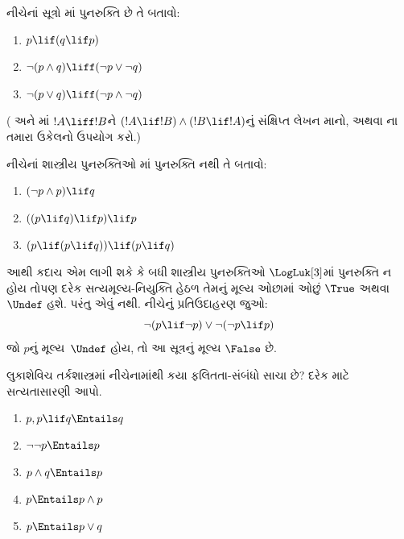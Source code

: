 \begin{prob}
  નીચેનાં સૂત્રો \LogLuk[3]માં પુનરુક્તિ છે તે બતાવો:
  \begin{enumerate}
    \item $p \lif (q \lif p)$
    \item\label{mvl:thr:luk:prob:luk-taut-2} $\lnot(p \land q) \liff (\lnot p \lor \lnot q)$
    \item\label{mvl:thr:luk:prob:luk-taut-3} $\lnot(p \lor q) \liff (\lnot p \land \lnot q)$
  \end{enumerate}
  ( અને
  માં $!A \liff !B$ને
  $(!A \lif !B) \land (!B \lif !A)$નું સંક્ષિપ્ત લેખન માનો,
  અથવા ના તમારા ઉકેલનો ઉપયોગ કરો.)
\end{prob}

\begin{prob}
  નીચેનાં શાસ્ત્રીય પુનરુક્તિઓ \LogLuk[3]માં પુનરુક્તિ નથી તે બતાવો:
  \begin{enumerate}
    \item $(\lnot p \land p) \lif q$
    \item $((p \lif q) \lif p) \lif p$
    \item $(p \lif (p \lif q)) \lif (p \lif q)$
  \end{enumerate}
\end{prob}

આથી કદાચ એમ લાગી શકે કે બધી શાસ્ત્રીય પુનરુક્તિઓ
$\LogLuk[3]$માં પુનરુક્તિ ન હોય તોપણ દરેક
સત્યમૂલ્ય-નિયુક્તિ હેઠળ તેમનું મૂલ્ય ઓછામાં ઓછું $\True$ અથવા
$\Undef$ હશે. પરંતુ એવું નથી. નીચેનું પ્રતિઉદાહરણ જુઓ:
\[
  \lnot(p \lif \lnot p) \lor \lnot(\lnot p \lif p)
\]
જો $p$નું મૂલ્ય~$\Undef$ હોય, તો આ સૂત્રનું મૂલ્ય $\False$ છે.

\begin{prob}
  લુકાશેવિચ તર્કશાસ્ત્રમાં નીચેનામાંથી કયા ફલિતતા-સંબંધો સાચા છે?
  દરેક માટે સત્યતાસારણી આપો.
  \begin{enumerate}
    \item $p, p \lif q \Entails q$
    \item $\lnot\lnot p \Entails p$
    \item $p \land q \Entails p$
    \item $p \Entails p \land p$
    \item $p \Entails p \lor q$
  \end{enumerate}
\end{prob}

